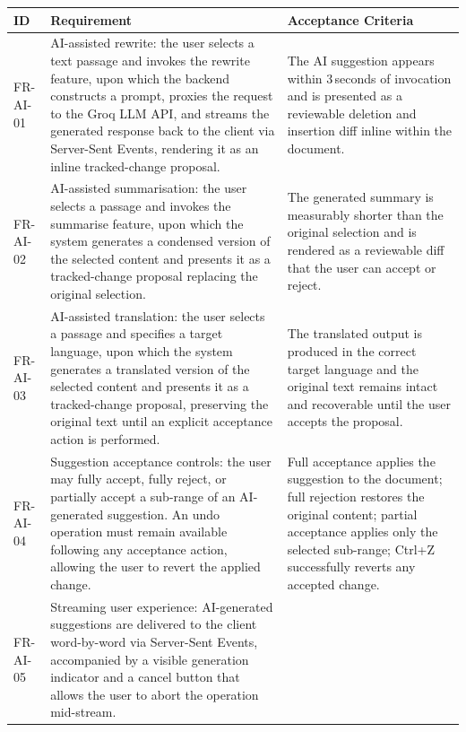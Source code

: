 \documentclass{article}
\begin{document}
\noindent
{\small
\begin{tabularx}{\textwidth}{|>{\hsize=0.2\hsize\raggedright\arraybackslash}X|>{\hsize=1.8\hsize\raggedright\arraybackslash}X|>{\hsize=1\hsize\raggedright\arraybackslash}X|}
    \hline
    \rowcolor{tableBlue} 
    \textbf{\color{white}ID} & 
    \textbf{\color{white}Requirement} & 
    \textbf{\color{white}Acceptance Criteria} \\
    \hline
    FR-AI-01 &
    AI-assisted rewrite: the user selects a text passage and invokes the rewrite feature, upon which the backend constructs a prompt, proxies the request to the Groq LLM API, and streams the generated response back to the client via Server-Sent Events, rendering it as an inline tracked-change proposal. &
    The AI suggestion appears within 3\,seconds of invocation and is presented as a reviewable deletion and insertion diff inline within the document. \\
    \hline
    FR-AI-02 &
    AI-assisted summarisation: the user selects a passage and invokes the summarise feature, upon which the system generates a condensed version of the selected content and presents it as a tracked-change proposal replacing the original selection. &
    The generated summary is measurably shorter than the original selection and is rendered as a reviewable diff that the user can accept or reject. \\
    \hline
    FR-AI-03 &
    AI-assisted translation: the user selects a passage and specifies a target language, upon which the system generates a translated version of the selected content and presents it as a tracked-change proposal, preserving the original text until an explicit acceptance action is performed. &
    The translated output is produced in the correct target language and the original text remains intact and recoverable until the user accepts the proposal. \\
    \hline
    FR-AI-04 &
    Suggestion acceptance controls: the user may fully accept, fully reject, or partially accept a sub-range of an AI-generated suggestion. An undo operation must remain available following any acceptance action, allowing the user to revert the applied change. &
    Full acceptance applies the suggestion to the document; full rejection restores the original content; partial acceptance applies only the selected sub-range; Ctrl+Z successfully reverts any accepted change. \\
    \hline
    FR-AI-05 &
    Streaming user experience: AI-generated suggestions are delivered to the client word-by-word via Server-Sent Events, accompanied by a visible generation indicator and a cancel button that allows the user to abort the operation mid-stream. &

\end{tabularx}}
\end{document}
